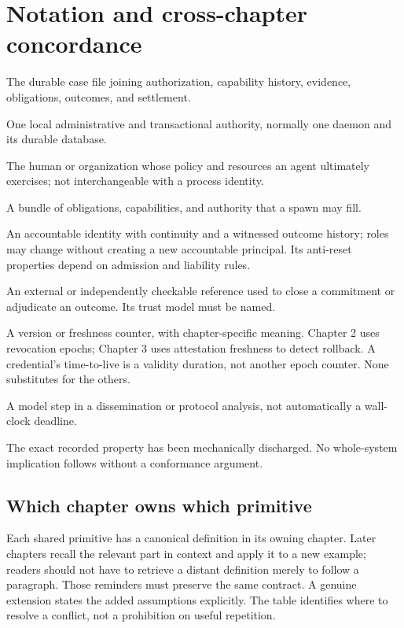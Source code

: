 \section{Notation and cross-chapter concordance}\label{app:concordance}
\begin{description}[leftmargin=1.4em,itemsep=4pt]
  \item[Work unit] The durable case file joining authorization, capability
  history, evidence, obligations, outcomes, and settlement.
  \item[Harbor] One local administrative and transactional authority, normally
  one daemon and its durable database.
  \item[Principal] The human or organization whose policy and resources an
  agent ultimately exercises; not interchangeable with a process identity.
  \item[Role] A bundle of obligations, capabilities, and authority that a spawn
  may fill.
  \item[Person] An accountable identity with continuity and a witnessed outcome history;
  roles may change without creating a new accountable principal. Its anti-reset
  properties depend on admission and liability rules.
  \item[Oracle] An external or independently checkable reference used to close
  a commitment or adjudicate an outcome. Its trust model must be named.
  \item[Epoch] A version or freshness counter, with chapter-specific meaning.
  Chapter 2 uses revocation epochs; Chapter 3 uses attestation freshness to
  detect rollback. A credential's time-to-live is a validity duration, not
  another epoch counter. None substitutes for the others.
  \item[Round] A model step in a dissemination or protocol analysis, not
  automatically a wall-clock deadline.
  \item[Closed] The exact recorded property has been mechanically discharged.
  No whole-system implication follows without a conformance argument.
\end{description}

\subsection*{Which chapter owns which primitive}
\label{app:ownership}

Each shared primitive has a canonical definition in its owning chapter.
Later chapters recall the relevant part in context and apply it to a new
example; readers should not have to retrieve a distant definition merely to
follow a paragraph. Those reminders must preserve the same contract. A genuine
extension states the added assumptions explicitly. The table identifies where
to resolve a conflict, not a prohibition on useful repetition.

